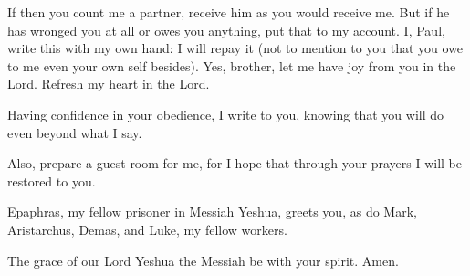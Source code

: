 \myverse{}If then you count me a partner, receive him as you would receive me. \myverse{}But if he has wronged you at all or owes you anything, put that to my account. \myverse{}I, Paul, write this with my own hand: I will repay it (not to mention to you that you owe to me even your own self besides). \myverse{}Yes, brother, let me have joy from you in the Lord. Refresh my heart in the Lord.


\myverse{}Having confidence in your obedience, I write to you, knowing	that you will do even beyond what I say.
		
\myverse{}Also, prepare a guest room for me, for I hope that through your prayers I will be restored to you.
		
\myverse{}Epaphras, my fellow prisoner in Messiah Yeshua, greets you, \myverse{}as do Mark, Aristarchus, Demas, and Luke, my fellow workers.
		
\myverse{}The grace of our Lord Yeshua the Messiah be with your spirit. Amen.
	
	
